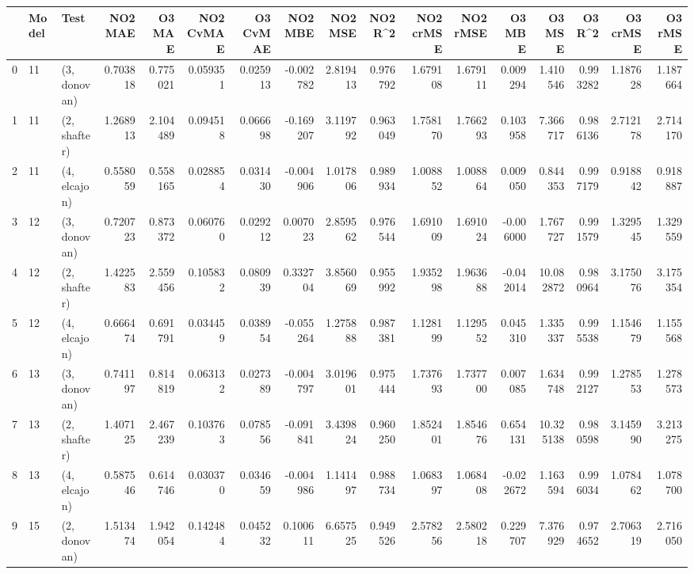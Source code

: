 \begin{tabular}{lllrrrrrrrrrrrrrr}
\toprule
{} & Model &          Test &   NO2 MAE &    O3 MAE &  NO2 CvMAE &  O3 CvMAE &   NO2 MBE &    NO2 MSE &   NO2 R\textasciicircum2 &  NO2 crMSE &  NO2 rMSE &    O3 MBE &     O3 MSE &    O3 R\textasciicircum2 &  O3 crMSE &   O3 rMSE \\
\midrule
0  &    11 &  (3, donovan) &  0.703818 &  0.775021 &   0.059351 &  0.025913 & -0.002782 &   2.819413 &  0.976792 &   1.679108 &  1.679111 &  0.009294 &   1.410546 &  0.993282 &  1.187628 &  1.187664 \\
1  &    11 &  (2, shafter) &  1.268913 &  2.104489 &   0.094518 &  0.066698 & -0.169207 &   3.119792 &  0.963049 &   1.758170 &  1.766293 &  0.103958 &   7.366717 &  0.986136 &  2.712178 &  2.714170 \\
2  &    11 &  (4, elcajon) &  0.558059 &  0.558165 &   0.028854 &  0.031430 & -0.004906 &   1.017806 &  0.989934 &   1.008852 &  1.008864 &  0.009050 &   0.844353 &  0.997179 &  0.918842 &  0.918887 \\
3  &    12 &  (3, donovan) &  0.720723 &  0.873372 &   0.060760 &  0.029212 &  0.007023 &   2.859562 &  0.976544 &   1.691009 &  1.691024 & -0.006000 &   1.767727 &  0.991579 &  1.329545 &  1.329559 \\
4  &    12 &  (2, shafter) &  1.422583 &  2.559456 &   0.105832 &  0.080939 &  0.332704 &   3.856069 &  0.955992 &   1.935298 &  1.963688 & -0.042014 &  10.082872 &  0.980964 &  3.175076 &  3.175354 \\
5  &    12 &  (4, elcajon) &  0.666474 &  0.691791 &   0.034459 &  0.038954 & -0.055264 &   1.275888 &  0.987381 &   1.128199 &  1.129552 &  0.045310 &   1.335337 &  0.995538 &  1.154679 &  1.155568 \\
6  &    13 &  (3, donovan) &  0.741197 &  0.814819 &   0.063132 &  0.027389 & -0.004797 &   3.019601 &  0.975444 &   1.737693 &  1.737700 &  0.007085 &   1.634748 &  0.992127 &  1.278553 &  1.278573 \\
7  &    13 &  (2, shafter) &  1.407125 &  2.467239 &   0.103763 &  0.078556 & -0.091841 &   3.439824 &  0.960250 &   1.852401 &  1.854676 &  0.654131 &  10.325138 &  0.980598 &  3.145990 &  3.213275 \\
8  &    13 &  (4, elcajon) &  0.587546 &  0.614746 &   0.030370 &  0.034659 & -0.004986 &   1.141497 &  0.988734 &   1.068397 &  1.068408 & -0.022672 &   1.163594 &  0.996034 &  1.078462 &  1.078700 \\
9  &    15 &  (2, donovan) &  1.513474 &  1.942054 &   0.142484 &  0.045232 &  0.100611 &   6.657525 &  0.949526 &   2.578256 &  2.580218 &  0.229707 &   7.376929 &  0.974652 &  2.706319 &  2.716050 \\

\end{tabular}
